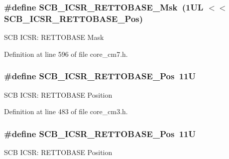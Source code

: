 \subsubsection[{\texorpdfstring{S\+C\+B\+\_\+\+I\+C\+S\+R\+\_\+\+R\+E\+T\+T\+O\+B\+A\+S\+E\+\_\+\+Msk}{SCB_ICSR_RETTOBASE_Msk}}]{\setlength{\rightskip}{0pt plus 5cm}\#define S\+C\+B\+\_\+\+I\+C\+S\+R\+\_\+\+R\+E\+T\+T\+O\+B\+A\+S\+E\+\_\+\+Msk~(1\+U\+L $<$$<$ S\+C\+B\+\_\+\+I\+C\+S\+R\+\_\+\+R\+E\+T\+T\+O\+B\+A\+S\+E\+\_\+\+Pos)}\hypertarget{group___c_m_s_i_s___s_c_b_gaca6fc3f79bb550f64fd7df782ed4a5f6}{}\label{group___c_m_s_i_s___s_c_b_gaca6fc3f79bb550f64fd7df782ed4a5f6}
S\+CB I\+C\+SR\+: R\+E\+T\+T\+O\+B\+A\+SE Mask 

Definition at line 596 of file core\+\_\+cm7.\+h.

\subsubsection[{\texorpdfstring{S\+C\+B\+\_\+\+I\+C\+S\+R\+\_\+\+R\+E\+T\+T\+O\+B\+A\+S\+E\+\_\+\+Pos}{SCB_ICSR_RETTOBASE_Pos}}]{\setlength{\rightskip}{0pt plus 5cm}\#define S\+C\+B\+\_\+\+I\+C\+S\+R\+\_\+\+R\+E\+T\+T\+O\+B\+A\+S\+E\+\_\+\+Pos~11U}\hypertarget{group___c_m_s_i_s___s_c_b_ga403d154200242629e6d2764bfc12a7ec}{}\label{group___c_m_s_i_s___s_c_b_ga403d154200242629e6d2764bfc12a7ec}
S\+CB I\+C\+SR\+: R\+E\+T\+T\+O\+B\+A\+SE Position 

Definition at line 483 of file core\+\_\+cm3.\+h.

\subsubsection[{\texorpdfstring{S\+C\+B\+\_\+\+I\+C\+S\+R\+\_\+\+R\+E\+T\+T\+O\+B\+A\+S\+E\+\_\+\+Pos}{SCB_ICSR_RETTOBASE_Pos}}]{\setlength{\rightskip}{0pt plus 5cm}\#define S\+C\+B\+\_\+\+I\+C\+S\+R\+\_\+\+R\+E\+T\+T\+O\+B\+A\+S\+E\+\_\+\+Pos~11U}\hypertarget{group___c_m_s_i_s___s_c_b_ga403d154200242629e6d2764bfc12a7ec}{}\label{group___c_m_s_i_s___s_c_b_ga403d154200242629e6d2764bfc12a7ec}
S\+CB I\+C\+SR\+: R\+E\+T\+T\+O\+B\+A\+SE Position 

